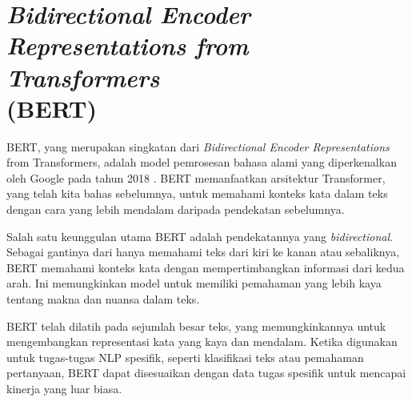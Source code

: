 \section{\textit{Bidirectional Encoder Representations from Transformers} \\ (BERT)}

BERT, yang merupakan singkatan dari \textit{Bidirectional Encoder Representations} from Transformers, adalah model pemrosesan bahasa alami yang diperkenalkan oleh Google pada tahun 2018 \parencite{bert}. BERT memanfaatkan arsitektur Transformer, yang telah kita bahas sebelumnya, untuk memahami konteks kata dalam teks dengan cara yang lebih mendalam daripada pendekatan sebelumnya.

Salah satu keunggulan utama BERT adalah pendekatannya yang \textit{bidirectional}. Sebagai gantinya dari hanya memahami teks dari kiri ke kanan atau sebaliknya, BERT memahami konteks kata dengan mempertimbangkan informasi dari kedua arah. Ini memungkinkan model untuk memiliki pemahaman yang lebih kaya tentang makna dan nuansa dalam teks.

BERT telah dilatih pada sejumlah besar teks, yang memungkinkannya untuk mengembangkan representasi kata yang kaya dan mendalam. Ketika digunakan untuk tugas-tugas NLP spesifik, seperti klasifikasi teks atau pemahaman pertanyaan, BERT dapat disesuaikan dengan data tugas spesifik untuk mencapai kinerja yang luar biasa.

